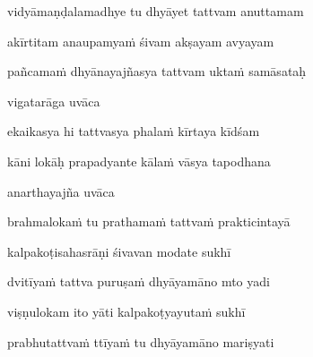 vidyāmaṇḍalamadhye tu dhyāyet tattvam anuttamam\thinspace{\dandab} \dontdisplaylinenum
{}

akīrtitam anaupamyaṁ śivam akṣayam avyayam \danda\dontdisplaylinenum

pañcamaṁ dhyānayajñasya tattvam uktaṁ samāsataḥ \veg\dontdisplaylinenum
{}

vigatarāga uvāca~{\dandab}\dontdisplaylinenum 

ekaikasya hi tattvasya phalaṁ kīrtaya kīdśam\thinspace{\danda} \dontdisplaylinenum
{}

kāni lokāḥ prapadyante kālaṁ vāsya tapodhana \veg\dontdisplaylinenum
{}

anarthayajña uvāca~{\dandab}\dontdisplaylinenum 

brahmalokaṁ tu prathamaṁ tattvaṁ prakticintayā\thinspace{\danda} \dontdisplaylinenum
{}

kalpakoṭisahasrāṇi śivavan modate sukhī \veg\dontdisplaylinenum
{}

dvitīyaṁ tattva puruṣaṁ dhyāyamāno mto yadi\thinspace{\dandab} \dontdisplaylinenum

viṣṇulokam ito yāti kalpakoṭyayutaṁ sukhī \veg\dontdisplaylinenum
{}

prabhutattvaṁ ttīyaṁ tu dhyāyamāno mariṣyati\thinspace{\dandab} \dontdisplaylinenum
{}

